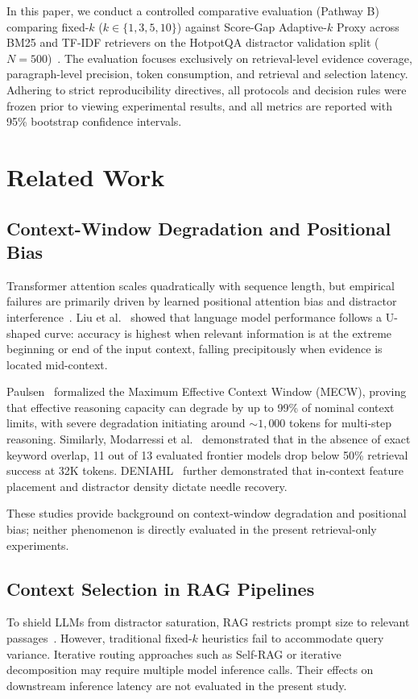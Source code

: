 \documentclass[conference]{IEEEtran}
\begin{document}
In this paper, we conduct a controlled comparative evaluation (Pathway B) comparing fixed-$k$ ($k \in \{1, 3, 5, 10\}$) against Score-Gap Adaptive-$k$ Proxy across BM25 and TF-IDF retrievers on the HotpotQA distractor validation split ($N=500$)~\cite{yang2018hotpotqa}. The evaluation focuses exclusively on retrieval-level evidence coverage, paragraph-level precision, token consumption, and retrieval and selection latency. Adhering to strict reproducibility directives, all protocols and decision rules were frozen prior to viewing experimental results, and all metrics are reported with 95\% bootstrap confidence intervals.

\section{Related Work}
\subsection{Context-Window Degradation and Positional Bias}
Transformer attention scales quadratically with sequence length, but empirical failures are primarily driven by learned positional attention bias and distractor interference~\cite{liu2024lost, hsieh2024found}. Liu et al.~\cite{liu2024lost} showed that language model performance follows a U-shaped curve: accuracy is highest when relevant information is at the extreme beginning or end of the input context, falling precipitously when evidence is located mid-context. 

Paulsen~\cite{paulsen2026context} formalized the Maximum Effective Context Window (MECW), proving that effective reasoning capacity can degrade by up to 99\% of nominal context limits, with severe degradation initiating around $\sim 1,000$ tokens for multi-step reasoning. Similarly, Modarressi et al.~\cite{modarressi2025nolima} demonstrated that in the absence of exact keyword overlap, 11 out of 13 evaluated frontier models drop below 50\% retrieval success at 32K tokens. DENIAHL~\cite{dai2024deniahl} further demonstrated that in-context feature placement and distractor density dictate needle recovery.

These studies provide background on context-window degradation and positional bias; neither phenomenon is directly evaluated in the present retrieval-only experiments.

\subsection{Context Selection in RAG Pipelines}
To shield LLMs from distractor saturation, RAG restricts prompt size to relevant passages~\cite{lewis2020rag}. However, traditional fixed-$k$ heuristics fail to accommodate query variance. Iterative routing approaches such as Self-RAG or iterative decomposition may require multiple model inference calls. Their effects on downstream inference latency are not evaluated in the present study. 
\end{document}
